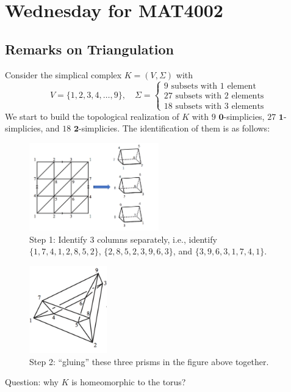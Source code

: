 \section{Wednesday for MAT4002}
\subsection{Remarks on Triangulation}
Consider the simplical complex $K=(V,\Sigma)$ with
\[
V=\{1,2,3,4,\dots,9\},\quad
\Sigma=\left\{
\begin{aligned}
\text{$9$ subsets with $1$ element}\\
\text{$27$ subsets with $2$ elements}\\
\text{$18$ subsets with $3$ elements}
\end{aligned}
\right.
\]
We start to build the topological realization of $K$ with $9$ $\bm0$-simplicies, $27$ $\bm1$-simplicies, and $18$ $\bm2$-simplicies. The identification of them is as follows:
\begin{figure}[H]
\centering
\includegraphics[width=0.5\textwidth]{week7/p_10}
\caption{Step 1: Identify 3 columns separately, i.e., identify $\{1,7,4,1,2,8,5,2\}$, $\{2,8,5,2,3,9,6,3\}$, and $\{3,9,6,3,1,7,4,1\}$.}
\end{figure}
\begin{figure}[H]
\centering
\includegraphics[width=0.3\textwidth]{week7/p_11}
\caption{Step 2: ``gluing'' these three prisms in the figure above together.}
\end{figure}

Question: why $K$ is homeomorphic to the torus?

